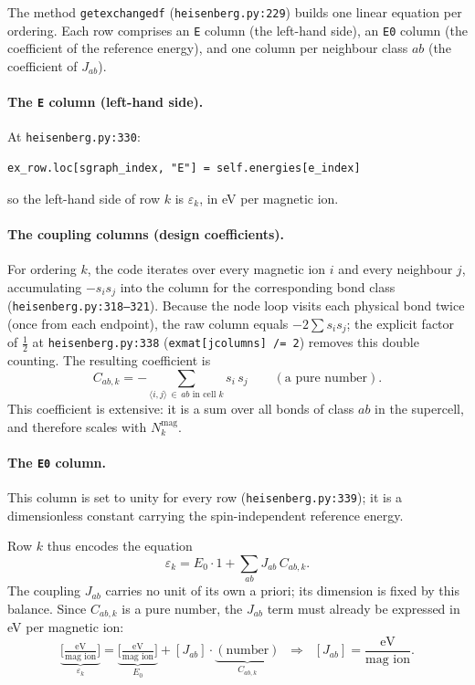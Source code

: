 \documentclass[11pt]{article}
\newcommand{\code}[1]{\texttt{\def\_{\textunderscore\allowbreak}#1}}
\begin{document}
The method \code{\_get\_exchange\_df} (\code{heisenberg.py:229}) builds one linear
equation per ordering. Each row comprises an \code{E} column (the left-hand
side), an \code{E0} column (the coefficient of the reference energy), and one
column per neighbour class $ab$ (the coefficient of $J_{ab}$).

\paragraph{The \code{E} column (left-hand side).} At \code{heisenberg.py:330}:
\begin{lstlisting}
ex_row.loc[sgraph_index, "E"] = self.energies[e_index]
\end{lstlisting}
so the left-hand side of row $k$ is $\varepsilon_k$, in eV per magnetic ion.

\paragraph{The coupling columns (design coefficients).} For ordering $k$, the
code iterates over every magnetic ion $i$ and every neighbour $j$, accumulating
$-s_i s_j$ into the column for the corresponding bond class
(\code{heisenberg.py:318--321}). Because the node loop visits each physical bond
twice (once from each endpoint), the raw column equals $-2\sum s_i s_j$; the
explicit factor of $\tfrac12$ at \code{heisenberg.py:338}
(\code{ex\_mat[j\_columns] /= 2}) removes this double counting. The resulting
coefficient is
\begin{equation}
  C_{ab,k} = -\!\!\sum_{\langle i,j\rangle \,\in\, ab \text{ in cell } k}\!\! s_i\, s_j
  \qquad (\text{a pure number}) .
\end{equation}
This coefficient is extensive: it is a sum over all bonds of class $ab$ in the
supercell, and therefore scales with $N_k^{\mathrm{mag}}$.

\paragraph{The \code{E0} column.} This column is set to unity for every row
(\code{heisenberg.py:339}); it is a dimensionless constant carrying the
spin-independent reference energy.

Row $k$ thus encodes the equation
\begin{equation}
  \varepsilon_k = E_0\cdot 1 + \sum_{ab} J_{ab}\, C_{ab,k} .
  \label{eq:row}
\end{equation}
The coupling $J_{ab}$ carries no unit of its own a priori; its dimension is fixed
by this balance. Since $C_{ab,k}$ is a pure number, the $J_{ab}$ term must already
be expressed in eV per magnetic ion:
\begin{equation}
  \underbrace{\Big[\tfrac{\text{eV}}{\text{mag ion}}\Big]}_{\varepsilon_k}
  = \underbrace{\Big[\tfrac{\text{eV}}{\text{mag ion}}\Big]}_{E_0}
  + [J_{ab}]\cdot\underbrace{(\text{number})}_{C_{ab,k}}
  \;\;\Longrightarrow\;\;
  [J_{ab}] = \frac{\text{eV}}{\text{mag ion}} .
\end{equation}
\end{document}
